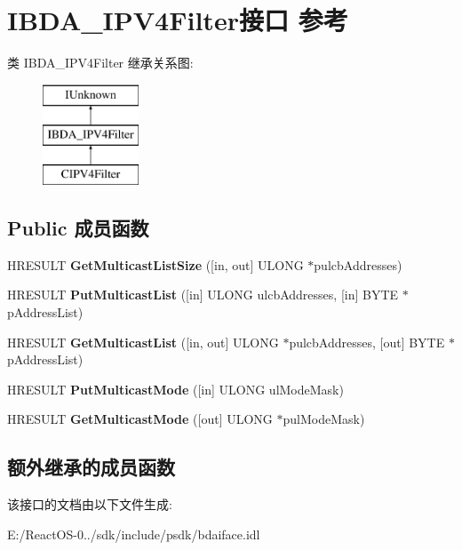 \hypertarget{interface_i_b_d_a___i_p_v4_filter}{}\section{I\+B\+D\+A\+\_\+\+I\+P\+V4\+Filter接口 参考}
\label{interface_i_b_d_a___i_p_v4_filter}
类 I\+B\+D\+A\+\_\+\+I\+P\+V4\+Filter 继承关系图\+:\begin{figure}[H]
\begin{center}
\leavevmode
\includegraphics[height=3.000000cm]{interface_i_b_d_a___i_p_v4_filter}
\end{center}
\end{figure}
\subsection*{Public 成员函数}
\begin{DoxyCompactItemize}
\item 
\mbox{\label{interface_i_b_d_a___i_p_v4_filter_ab424c2556f665770b4ea041adbbde6e2}} 
H\+R\+E\+S\+U\+LT {\bfseries Get\+Multicast\+List\+Size} (\mbox{[}in, out\mbox{]} U\+L\+O\+NG $\ast$pulcb\+Addresses)
\item 
\mbox{\label{interface_i_b_d_a___i_p_v4_filter_ae62b3e83fed1dc95091b3d6692ceecfe}} 
H\+R\+E\+S\+U\+LT {\bfseries Put\+Multicast\+List} (\mbox{[}in\mbox{]} U\+L\+O\+NG ulcb\+Addresses, \mbox{[}in\mbox{]} B\+Y\+TE $\ast$p\+Address\+List)
\item 
\mbox{\label{interface_i_b_d_a___i_p_v4_filter_a58bc48c316fe6c26f4c9cd49596fae1f}} 
H\+R\+E\+S\+U\+LT {\bfseries Get\+Multicast\+List} (\mbox{[}in, out\mbox{]} U\+L\+O\+NG $\ast$pulcb\+Addresses, \mbox{[}out\mbox{]} B\+Y\+TE $\ast$p\+Address\+List)
\item 
\mbox{\label{interface_i_b_d_a___i_p_v4_filter_a00fc1d1c1886840760d0c26148436eac}} 
H\+R\+E\+S\+U\+LT {\bfseries Put\+Multicast\+Mode} (\mbox{[}in\mbox{]} U\+L\+O\+NG ul\+Mode\+Mask)
\item 
\mbox{\label{interface_i_b_d_a___i_p_v4_filter_aac6b50041b35123b9d82a6f5d3e292c4}} 
H\+R\+E\+S\+U\+LT {\bfseries Get\+Multicast\+Mode} (\mbox{[}out\mbox{]} U\+L\+O\+NG $\ast$pul\+Mode\+Mask)
\end{DoxyCompactItemize}
\subsection*{额外继承的成员函数}


该接口的文档由以下文件生成\+:\begin{DoxyCompactItemize}
\item 
E\+:/\+React\+O\+S-\/0../sdk/include/psdk/bdaiface.\+idl\end{DoxyCompactItemize}
